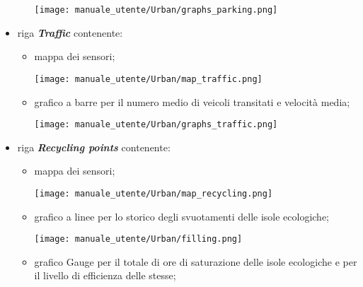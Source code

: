 \begin{itemize}
\begin{itemize}
        \begin{center}
            \texttt{[image: manuale\_utente/Urban/graphs\_parking.png]}
        \end{center}
    \end{itemize}
    \item riga \textit{\textbf{Traffic}} contenente:
    \begin{itemize}
        \item mappa dei sensori;
        \begin{center}
            \texttt{[image: manuale\_utente/Urban/map\_traffic.png]}
        \end{center}
        \item grafico a barre per il numero medio di veicoli transitati e velocità media;
        \begin{center}
            \texttt{[image: manuale\_utente/Urban/graphs\_traffic.png]}
        \end{center}
    \end{itemize}
    \item riga \textit{\textbf{Recycling points}} contenente:
    \begin{itemize}
        \item mappa dei sensori;
        \begin{center}
            \texttt{[image: manuale\_utente/Urban/map\_recycling.png]}
        \end{center}
        \item grafico a linee per lo storico degli svuotamenti delle isole ecologiche;
        \begin{center}
            \texttt{[image: manuale\_utente/Urban/filling.png]}
        \end{center}
        \item grafico Gauge per il totale di ore di saturazione delle isole ecologiche e per il livello di efficienza delle stesse;
        \begin{center}

\end{center}
\end{itemize}
\end{itemize}
